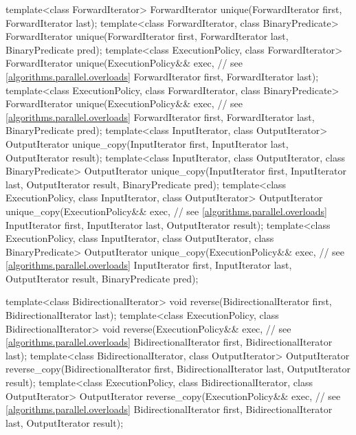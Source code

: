 \begin{codeblock}
{  template<class ForwardIterator>
    ForwardIterator unique(ForwardIterator first, ForwardIterator last);
  template<class ForwardIterator, class BinaryPredicate>
    ForwardIterator unique(ForwardIterator first, ForwardIterator last,
                           BinaryPredicate pred);
  template<class ExecutionPolicy, class ForwardIterator>
    ForwardIterator unique(ExecutionPolicy&& exec, // see \ref{algorithms.parallel.overloads}
                           ForwardIterator first, ForwardIterator last);
  template<class ExecutionPolicy, class ForwardIterator, class BinaryPredicate>
    ForwardIterator unique(ExecutionPolicy&& exec, // see \ref{algorithms.parallel.overloads}
                           ForwardIterator first, ForwardIterator last,
                           BinaryPredicate pred);
  template<class InputIterator, class OutputIterator>
    OutputIterator unique_copy(InputIterator first, InputIterator last,
                               OutputIterator result);
  template<class InputIterator, class OutputIterator, class BinaryPredicate>
    OutputIterator unique_copy(InputIterator first, InputIterator last,
                               OutputIterator result, BinaryPredicate pred);
  template<class ExecutionPolicy, class InputIterator, class OutputIterator>
    OutputIterator unique_copy(ExecutionPolicy&& exec, // see \ref{algorithms.parallel.overloads}
                               InputIterator first, InputIterator last,
                               OutputIterator result);
  template<class ExecutionPolicy, class InputIterator, class OutputIterator,
           class BinaryPredicate>
    OutputIterator unique_copy(ExecutionPolicy&& exec, // see \ref{algorithms.parallel.overloads}
                               InputIterator first, InputIterator last,
                               OutputIterator result, BinaryPredicate pred);

  template<class BidirectionalIterator>
    void reverse(BidirectionalIterator first, BidirectionalIterator last);
  template<class ExecutionPolicy, class BidirectionalIterator>
    void reverse(ExecutionPolicy&& exec, // see \ref{algorithms.parallel.overloads}
                 BidirectionalIterator first, BidirectionalIterator last);
  template<class BidirectionalIterator, class OutputIterator>
    OutputIterator reverse_copy(BidirectionalIterator first,
                                BidirectionalIterator last,
                                OutputIterator result);
  template<class ExecutionPolicy, class BidirectionalIterator, class OutputIterator>
    OutputIterator reverse_copy(ExecutionPolicy&& exec, // see \ref{algorithms.parallel.overloads}
                                BidirectionalIterator first,
                                BidirectionalIterator last,
                                OutputIterator result);

}
\end{codeblock}
